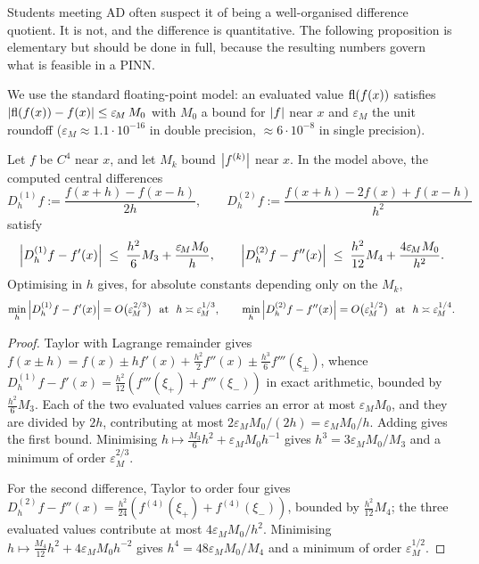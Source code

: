 \documentclass[11pt,a4paper]{article}
\begin{document}
Students meeting AD often suspect it of being a well-organised difference quotient. It is not, and
the difference is quantitative. The following proposition is elementary but should be done in full,
because the resulting numbers govern what is feasible in a PINN.

We use the standard floating-point model: an evaluated value $\mathrm{fl}(f(x))$ satisfies
$\left\lvert \mathrm{fl}(f(x)) - f(x) \right\rvert \le \varepsilon_{\!M}\, M_0$ with $M_0$ a bound for $\left\lvert f \right\rvert$ near $x$ and
$\varepsilon_{\!M}$ the unit roundoff ($\varepsilon_{\!M} \approx 1.1\cdot 10^{-16}$ in double
precision, $\approx 6\cdot 10^{-8}$ in single precision).

\begin{proposition}\label{prop:fd}
Let $f$ be $C^4$ near $x$, and let $M_k$ bound $\left\lvert f^{(k)} \right\rvert$ near $x$. In the model above, the
computed central differences
\[
D_h^{(1)} f := \frac{f(x+h) - f(x-h)}{2h},
\qquad
D_h^{(2)} f := \frac{f(x+h) - 2f(x) + f(x-h)}{h^2}
\]
satisfy
\[
\left\lvert D_h^{(1)} f - f'(x) \right\rvert \;\le\; \frac{h^2}{6}M_3 + \frac{\varepsilon_{\!M} M_0}{h},
\qquad
\left\lvert D_h^{(2)} f - f''(x) \right\rvert \;\le\; \frac{h^2}{12}M_4 + \frac{4\varepsilon_{\!M} M_0}{h^2}.
\]
Optimising in $h$ gives, for absolute constants depending only on the $M_k$,
\[
\min_h \abs{D_h^{(1)} f - f'(x)} = O\big(\varepsilon_{\!M}^{2/3}\big) \ \text{ at } \ h \asymp \varepsilon_{\!M}^{1/3},
\qquad
\min_h \abs{D_h^{(2)} f - f''(x)} = O\big(\varepsilon_{\!M}^{1/2}\big) \ \text{ at } \ h \asymp \varepsilon_{\!M}^{1/4}.
\]
\end{proposition}

\begin{proof}
Taylor with Lagrange remainder gives
$f(x \pm h) = f(x) \pm hf'(x) + \tfrac{h^2}{2}f''(x) \pm \tfrac{h^3}{6}f'''(\xi_\pm)$, whence
$D_h^{(1)}f - f'(x) = \tfrac{h^2}{12}(f'''(\xi_+) + f'''(\xi_-))$ in exact arithmetic, bounded by
$\tfrac{h^2}{6}M_3$. Each of the two evaluated values carries an error at most
$\varepsilon_{\!M}M_0$, and they are divided by $2h$, contributing at most
$2\varepsilon_{\!M}M_0/(2h) = \varepsilon_{\!M}M_0/h$. Adding gives the first bound. Minimising
$h \mapsto \tfrac{M_3}{6}h^2 + \varepsilon_{\!M}M_0 h^{-1}$ gives
$h^3 = 3\varepsilon_{\!M}M_0/M_3$ and a minimum of order $\varepsilon_{\!M}^{2/3}$.

For the second difference, Taylor to order four gives
$D_h^{(2)}f - f''(x) = \tfrac{h^2}{24}(f^{(4)}(\xi_+) + f^{(4)}(\xi_-))$, bounded by
$\tfrac{h^2}{12}M_4$; the three evaluated values contribute at most
$4\varepsilon_{\!M}M_0/h^2$. Minimising $h \mapsto \tfrac{M_4}{12}h^2 + 4\varepsilon_{\!M}M_0h^{-2}$
gives $h^4 = 48\varepsilon_{\!M}M_0/M_4$ and a minimum of order $\varepsilon_{\!M}^{1/2}$.
\end{proof}
\end{document}

